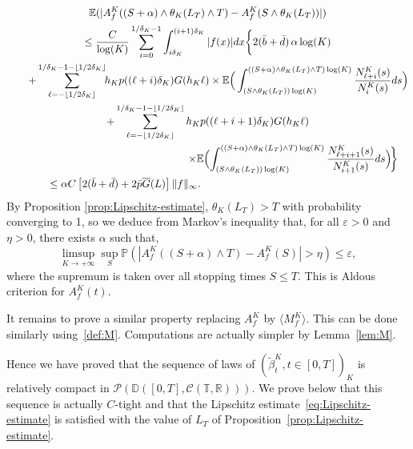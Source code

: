 \documentclass[JEP,XML,SOM,Unicode,published]{cedram}
\let\cal\mathcal
\theoremstyle{plain}
\theoremstyle{remark}
\renewcommand\P{\mathbb{P}}
\begin{document}
\begin{multline*}
\mathbb{E}(|A^K_{f}((S+\alpha)\wedge\theta_K(L_T)\wedge T) -A^K_{f} (S\wedge\theta_K(L_T))|) \\
 \leq {C\over \log(K)}\sum_{i=0}^{1/\delta_K-1} \int_{i\delta_{K}}^{(i+1)\delta_{K}} |f(x)|dx\bigg\{ 2(\bar b+\bar d)\,\alpha\log(K)\\ 
 \qquad+ \sum_{\ell=-\lfloor 1/2\delta_K\rfloor}^{1/\delta_K-1-\lfloor 1/2\delta_K\rfloor}\hspace*{-3pt}h_Kp((\ell+i)\delta_K)G(h_K\ell)\times \mathbb{E}\Big(\int_{(S\wedge\theta_K(L_T)) \log(K)}^{((S+\alpha)\wedge\theta_K(L_T)\wedge T)\log(K)} {N^K_{\ell+i}(s)\over N^K_{i}(s)}ds\Bigr)\\
 + \sum_{\ell=-\lfloor 1/2\delta_K\rfloor}^{1/\delta_K-1-\lfloor 1/2\delta_K\rfloor}h_Kp((\ell+i+1)\delta_K)G(h_K\ell) \\
\shoveright{\times \mathbb{E}\Bigl(\int_{(S\wedge\theta_K(L_T)) \log(K)}^{((S+\alpha)\wedge\theta_K(L_T)\wedge T)\log(K)} {N^K_{\ell+i+1}(s)\over N^K_{i+1}(s)}ds\Bigr)\!\biggr\}}\\
\leq \alpha C\left[2(\bar b+\bar d)+2\bar p\overline{G}(L) \right]\|f\|_\infty.\hspace*{5.5cm} 
\end{multline*}
By Proposition \ref{prop:Lipschitz-estimate}, $\theta_K(L_T)>T$ with probability converging to 1, so we deduce from Markov's inequality that, for all $\varepsilon>0$ and $\eta>0$, there exists $\alpha$ such that,
\[
\limsup_{K\to+\infty}\sup_S\P(|A^K_{f}((S+\alpha)\wedge T) -A^K_{f} (S)|>\eta)\leq\varepsilon,
\]
where the supremum is taken over all stopping times $S\leq T$. This is Aldous criterion for $A^K_{f}(t)$.

It remains to prove a similar property replacing $A^K_{f}$ by $\langle M^K_{f} \rangle$. This can be done similarly using~\eqref{def:M}. Computations are actually simpler by Lemma~\ref{lem:M}.

Hence we have proved that the sequence of laws of $(\tilde \beta^K_{t}, t\in[0,T])_{K}$ is relatively compact in ${\cal P}(\mathbb{D}([0,T],{\cal C}(\mathbb{T},\mathbb{R})))$. We prove below that this sequence is actually $C$-tight and that the Lipschitz estimate~\eqref{eq:Lipschitz-estimate} is satisfied with the value of $L_T$ of Proposition~\ref{prop:Lipschitz-estimate}.
\end{document}
